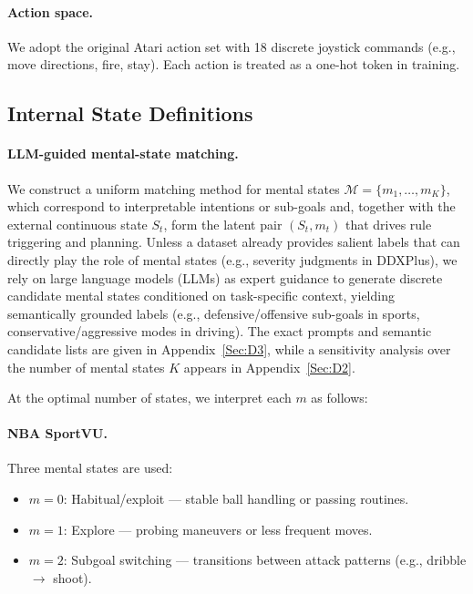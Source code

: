 \documentclass{article} %
\begin{document}
\paragraph{Action space.}
We adopt the original Atari action set with 18 discrete joystick commands (e.g., move directions, fire, stay). Each action is treated as a one-hot token in training.

\subsection{Internal State Definitions}
\label{Sec:B6}

\paragraph{LLM-guided mental-state matching.}
We construct a uniform matching method for mental states $\mathcal{M}=\{m_1,\dots,m_K\}$,
which correspond to interpretable intentions or sub-goals and, together with the external
continuous state $S_t$, form the latent pair $(S_t,m_t)$ that drives rule triggering and planning.
Unless a dataset already provides salient labels that can directly play the role of mental states
(e.g., severity judgments in DDXPlus), we rely on large language models (LLMs) as expert guidance
to generate discrete candidate mental states conditioned on task-specific context, yielding
semantically grounded labels (e.g., defensive/offensive sub-goals in sports, conservative/aggressive
modes in driving). The exact prompts and semantic candidate lists are given in
Appendix~\ref{Sec:D3}, while a sensitivity analysis over the number of mental states $K$
appears in Appendix~\ref{Sec:D2}.


At the optimal number of states, we interpret each $m$ as follows:

\paragraph{NBA SportVU.}
Three mental states are used:
\begin{itemize}
  \item $m=0$: Habitual/exploit --- stable ball handling or passing routines.
  \item $m=1$: Explore --- probing maneuvers or less frequent moves.
  \item $m=2$: Subgoal switching --- transitions between attack patterns (e.g., dribble $\to$ shoot).
\end{itemize}
\end{document}
